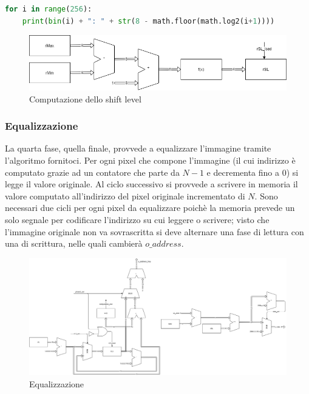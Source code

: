 \documentclass[11pt]{article} %
\begin{document}
\begin{lstlisting}[language=Python, caption=Generazione di soglie, label={lst:soglie}]
for i in range(256):
	print(bin(i) + ": " + str(8 - math.floor(math.log2(i+1))))
\end{lstlisting}

\begin{figure}[h]
\centering
\includegraphics[width=120mm]{datapaths/regSL_final.png}
\caption{Computazione dello shift level}
\end{figure}


\subsubsection{Equalizzazione}
La quarta fase, quella finale, provvede a equalizzare l'immagine tramite l'algoritmo fornitoci. Per ogni pixel che compone l'immagine (il cui indirizzo è computato grazie ad un contatore che parte da $N-1$ e decrementa fino a 0) si legge il valore originale. Al ciclo successivo si provvede a scrivere in memoria il valore computato all'indirizzo del pixel originale incrementato di $N$. Sono necessari due cicli per ogni pixel da equalizzare poichè la memoria prevede un solo segnale per codificare l'indirizzo su cui leggere o scrivere; visto che l'immagine originale non va sovrascritta si deve alternare una fase di lettura con una di scrittura, nelle quali cambierà $o\_address$.

\begin{figure}[h]
\centering
\includegraphics[width=120mm]{datapaths/computation.png}
\caption{Equalizzazione}
\end{figure}
\end{document}
